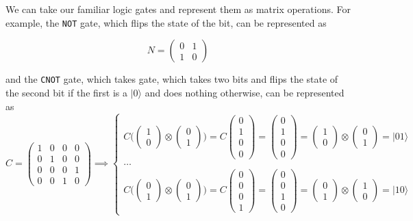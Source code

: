 \documentclass{article}
\theoremstyle{definition}
\begin{document}
We can take our familiar logic gates and represent them as matrix operations. For example, the \texttt{NOT} gate, which flips the state of the bit, can be represented as 

  \[N = \begin{pmatrix} 0 & 1 \\ 1 & 0 \end{pmatrix}\]

and the \texttt{CNOT} gate, which takes gate, which takes two bits and flips the state of the second bit if the first is a $|0\rangle$ and does nothing otherwise, can be represented as 
  \[
    C = \begin{pmatrix} 1&0&0&0\\0&1&0&0\\0&0&0&1\\0&0&1&0 \end{pmatrix} \implies \begin{cases} C \Bigg( \begin{pmatrix} 1 \\ 0 \end{pmatrix} \otimes \begin{pmatrix} 0 \\ 1 \end{pmatrix} \Bigg) = C \begin{pmatrix} 0\\1\\0\\0 \end{pmatrix} = \begin{pmatrix} 0\\1\\0\\0 \end{pmatrix} = \begin{pmatrix} 1 \\ 0 \end{pmatrix} \otimes \begin{pmatrix} 0 \\ 1 \end{pmatrix} = |01\rangle\\
    \ldots \\
    C \Bigg( \begin{pmatrix} 0 \\ 1 \end{pmatrix} \otimes \begin{pmatrix} 0 \\ 1 \end{pmatrix} \Bigg) = C \begin{pmatrix} 0\\0\\0\\1 \end{pmatrix} = \begin{pmatrix} 0\\0\\1\\0 \end{pmatrix} = \begin{pmatrix} 0 \\ 1 \end{pmatrix} \otimes \begin{pmatrix} 1 \\ 0 \end{pmatrix} = |10\rangle 
    \end{cases}
  \]
\end{document}
